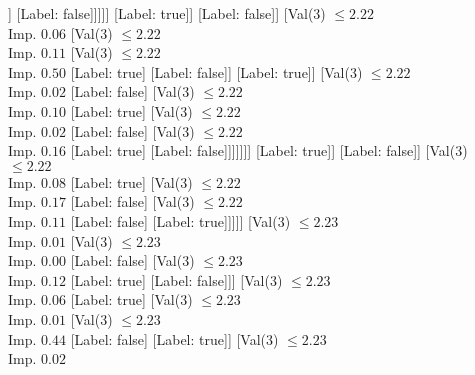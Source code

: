 \documentclass[margin=10pt]{standalone}
\begin{document}
\begin{forest}
																									[Val($3$) $ \leq 2.21$ \\ Imp. $0.38$
																										[Label: false]
																										[Label: true]]
																									[Label: false]]]]]
																					[Label: true]]
																				[Label: false]]
																			[Val($3$) $ \leq 2.22$ \\ Imp. $0.06$
																				[Val($3$) $ \leq 2.22$ \\ Imp. $0.11$
																					[Val($3$) $ \leq 2.22$ \\ Imp. $0.50$
																						[Label: true]
																						[Label: false]]
																					[Label: true]]
																				[Val($3$) $ \leq 2.22$ \\ Imp. $0.02$
																					[Label: false]
																					[Val($3$) $ \leq 2.22$ \\ Imp. $0.10$
																						[Label: true]
																						[Val($3$) $ \leq 2.22$ \\ Imp. $0.02$
																							[Label: false]
																							[Val($3$) $ \leq 2.22$ \\ Imp. $0.16$
																								[Label: true]
																								[Label: false]]]]]]]
																		[Label: true]]
																	[Label: false]]
																[Val($3$) $ \leq 2.22$ \\ Imp. $0.08$
																	[Label: true]
																	[Val($3$) $ \leq 2.22$ \\ Imp. $0.17$
																		[Label: false]
																		[Val($3$) $ \leq 2.22$ \\ Imp. $0.11$
																			[Label: false]
																			[Label: true]]]]]
															[Val($3$) $ \leq 2.23$ \\ Imp. $0.01$
																[Val($3$) $ \leq 2.23$ \\ Imp. $0.00$
																	[Label: false]
																	[Val($3$) $ \leq 2.23$ \\ Imp. $0.12$
																		[Label: true]
																		[Label: false]]]
																[Val($3$) $ \leq 2.23$ \\ Imp. $0.06$
																	[Label: true]
																	[Val($3$) $ \leq 2.23$ \\ Imp. $0.01$
																		[Val($3$) $ \leq 2.23$ \\ Imp. $0.44$
																			[Label: false]
																			[Label: true]]
																		[Val($3$) $ \leq 2.23$ \\ Imp. $0.02$

\end{forest}
\end{document}
